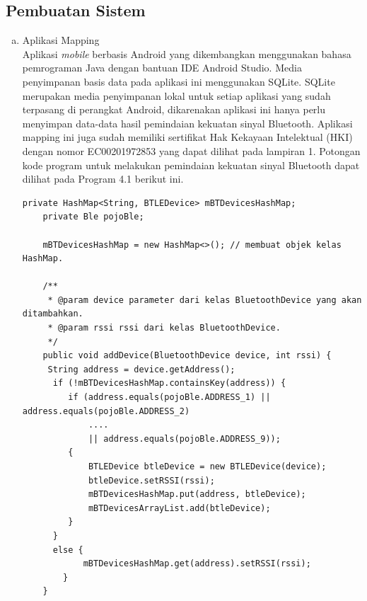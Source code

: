 \subsection{Pembuatan Sistem}

\begin{enumerate}[a.]
\item Aplikasi Mapping
\\ Aplikasi \textit{mobile} berbasis Android yang dikembangkan menggunakan bahasa pemrograman Java dengan bantuan IDE Android Studio. Media penyimpanan basis data pada aplikasi ini menggunakan SQLite. SQLite merupakan media penyimpanan lokal untuk setiap aplikasi yang sudah terpasang di perangkat Android, dikarenakan aplikasi ini hanya perlu menyimpan data-data hasil pemindaian kekuatan sinyal Bluetooth. Aplikasi mapping ini juga sudah memiliki sertifikat Hak Kekayaan Intelektual (HKI) dengan nomor EC00201972853 yang dapat dilihat pada lampiran 1. Potongan kode program untuk melakukan pemindaian kekuatan sinyal Bluetooth dapat dilihat pada Program 4.1 berikut ini.
\vspace{0.4cm}
\begin{lstlisting}[label=programScanBle]
    private HashMap<String, BTLEDevice> mBTDevicesHashMap;
    private Ble pojoBle;

    mBTDevicesHashMap = new HashMap<>(); // membuat objek kelas HashMap.
	
	/**
     * @param device parameter dari kelas BluetoothDevice yang akan ditambahkan.
     * @param rssi rssi dari kelas BluetoothDevice.
     */
    public void addDevice(BluetoothDevice device, int rssi) {
     String address = device.getAddress();
      if (!mBTDevicesHashMap.containsKey(address)) {
         if (address.equals(pojoBle.ADDRESS_1) || address.equals(pojoBle.ADDRESS_2) 
             .... 
             || address.equals(pojoBle.ADDRESS_9));
         {
             BTLEDevice btleDevice = new BTLEDevice(device);
             btleDevice.setRSSI(rssi);
             mBTDevicesHashMap.put(address, btleDevice);
             mBTDevicesArrayList.add(btleDevice);
         }
      }
      else {
            mBTDevicesHashMap.get(address).setRSSI(rssi);
        }
    }
	\end{lstlisting}



\end{enumerate}
